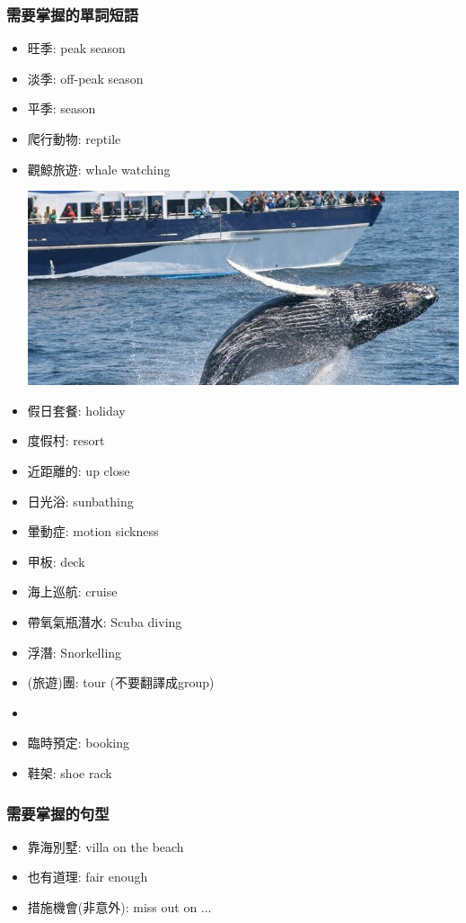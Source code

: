 \subsubsection*{需要掌握的單詞短語}
\begin{multicols}{2}
\begin{itemize}
  \itemsep0em
  \item 旺季: peak season
  \item 淡季: off-peak season
  \item 平季:  season
  \item 爬行動物: reptile
  \item 觀鯨旅遊: whale watching
  \begin{center}
    \includegraphics[scale=.3]{pics/whale-watching}
  \end{center}
  \item 假日套餐: holiday 
  \item 度假村: resort
  \item 近距離的: up close
  \item 日光浴: sunbathing
  \item 暈動症: motion sickness
  \item 甲板: deck
  \item 海上巡航: cruise
  \item 帶氧氣瓶潛水: Scuba diving
  \item 浮潛: Snorkelling
  \item (旅遊)團: tour (不要翻譯成group)
  \item {}
  \item 臨時預定:  booking
  \item 鞋架: shoe rack
\end{itemize}
\end{multicols}

\subsubsection*{需要掌握的句型}
\begin{itemize}
  \itemsep0em
  \item 靠海別墅: villa on the beach
  \item 也有道理: fair enough
  \item 措施機會(非意外): miss out on ...
\end{itemize}


